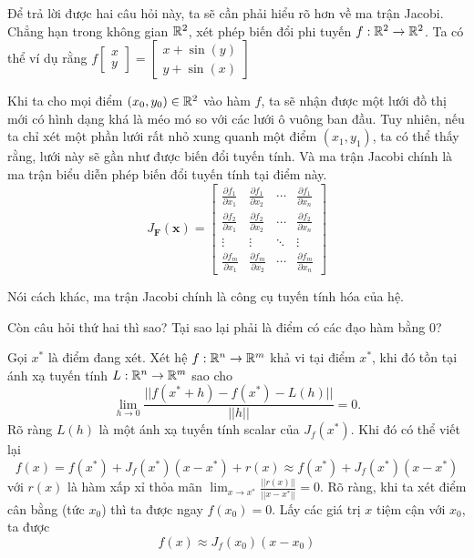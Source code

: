 \documentclass[12pt]{scrartcl}
\begin{document}
Để trả lời được hai câu hỏi này, ta sẽ cần phải hiểu rõ hơn về ma trận Jacobi. Chẳng hạn trong không gian $\mathbb{R}^2$, xét phép biến đổi phi tuyến $f: \mathbb{R}^2 \to \mathbb{R}^2$. Ta có thể ví dụ rằng $f\begin{bmatrix}
    x\\y 
\end{bmatrix} = \begin{bmatrix}
    x + \sin(y)\\y + \sin(x)
\end{bmatrix}$

Khi ta cho mọi điểm $(x_0,y_0) \in \mathbb{R}^2$ vào hàm $f$, ta sẽ nhận được một lưới đồ thị mới có hình dạng khá là méo mó so với các lưới ô vuông ban đầu. Tuy nhiên, nếu ta chỉ xét một phần lưới rất nhỏ xung quanh một điểm $(x_1,y_1)$, ta có thể thấy rằng, lưới này sẽ gần như được biến đổi tuyến tính. Và ma trận Jacobi chính là ma trận biểu diễn phép biến đổi tuyến tính tại điểm này. 
\[
    J_{\mathbf{F}}(\mathbf{x}) =
\begin{bmatrix}
\displaystyle \frac{\partial f_1}{\partial x_1} &
\displaystyle \frac{\partial f_1}{\partial x_2} &
\cdots &
\displaystyle \frac{\partial f_1}{\partial x_n} 
\\[12pt]
\displaystyle \frac{\partial f_2}{\partial x_1} &
\displaystyle \frac{\partial f_2}{\partial x_2} &
\cdots &
\displaystyle \frac{\partial f_2}{\partial x_n} 
\\[12pt]
\vdots & \vdots & \ddots & \vdots \\[6pt]
\displaystyle \frac{\partial f_m}{\partial x_1} &
\displaystyle \frac{\partial f_m}{\partial x_2} &
\cdots &
\displaystyle \frac{\partial f_m}{\partial x_n} 
\end{bmatrix}
\]

Nói cách khác, ma trận Jacobi chính là công cụ tuyến tính hóa của hệ.

Còn câu hỏi thứ hai thì sao? Tại sao lại phải là điểm có các đạo hàm bằng 0? 

Gọi $x^*$ là điểm đang xét. Xét hệ $f: \mathbb{R}^n \to \mathbb{R}^m$ khả vi tại điểm $x^*$, khi đó tồn tại ánh xạ tuyến tính $L: \mathbb{R}^n \to \mathbb{R}^m$ sao cho
\[
    \lim_{h \to 0} \frac{|| f(x^* + h) - f(x^*) - L(h)||}{||h||} = 0. 
\]
Rõ ràng $L(h)$ là một ánh xạ tuyến tính scalar của $J_f(x^*)$. Khi đó có thể viết lại 
\[
    f(x) = f(x^*) + J_f(x^*) (x - x^*) + r(x) \approx  f(x^*) + J_f(x^*) (x - x^*)
\]
với $r(x)$ là hàm xấp xỉ thỏa mãn $\displaystyle \lim_{x \to x^*} \frac{||r(x)||}{||x - x^*||} = 0$. Rõ ràng, khi ta xét điểm cân bằng (tức $x_0$) thì ta được ngay $f(x_0) = 0$. Lấy các giá trị $x$ tiệm cận với $x_0$, ta được 
\[
    f(x) \approx J_f(x_0) (x - x_0) \tag{1}
\]
\end{document}
